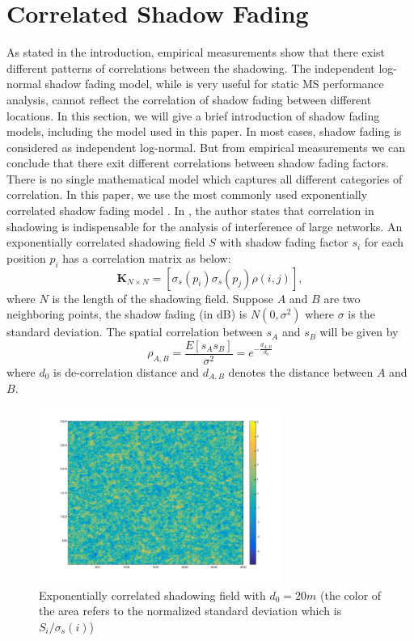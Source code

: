 \documentclass[journal,10pt]{IEEEtran}
\begin{document}
\section{Correlated Shadow Fading}
\label{CorrShadowField}
As stated in the introduction, empirical measurements show that there exist different patterns of correlations between the shadowing. The independent log-normal shadow fading model, while is very useful for static MS performance analysis, cannot reflect the correlation of shadow fading between different locations. In this section, we will give a brief introduction of shadow fading models, including the model used in this paper.
In most cases, shadow fading is considered as independent log-normal. But from empirical measurements we can conclude that there exit different correlations between shadow fading factors. There is no single mathematical model which captures all different categories of correlation\cite{szyszkowicz2010feasibility}. In this paper, we use the most commonly used exponentially correlated shadow fading model \cite{szyszkowicz2011interference}. In \cite{szyszkowicz2011interference}, the author states that correlation in shadowing is indispensable for the analysis of interference of large networks. An exponentially correlated shadowing field $S$ with shadow fading factor $s_{i}$ for each position $p_{i}$ has a correlation matrix as below:
\begin{equation}
\mathbf{K}_{N\times N} = [ \sigma_{s}(p_{i})\sigma_{s}(p_{j})\rho(i,j)],
\label{correlationmatrix}
\end{equation}
where $N$ is the length of the shadowing field. Suppose $A$ and $B$ are two neighboring points, the shadow fading (in dB) is $N(0,\sigma^2)$ where $\sigma$ is the standard deviation. The spatial correlation between $s_{A}$ and $s_{B}$ will be given by 
\begin{equation}
\rho_{A,B} = \frac{E[s_{A}s_{B}]}{\sigma^2} =e^{-\frac{d_{A,B}}{d_{0}}}
\end{equation}
where $d_{0}$ is de-correlation distance and  $d_{A, B}$ denotes the distance between $A$ and $B$.
\begin{figure}
\centering
\includegraphics[width = 8cm]{ShadowFieldDeCorr20.jpg}
\caption{Exponentially correlated shadowing field with $d_{0} = 20m$ (the color of the area refers to the normalized standard deviation  which is $S_{i}/\sigma_{s}(i)$)}

\label{shadowingfield}
\end{figure}
\end{document}
